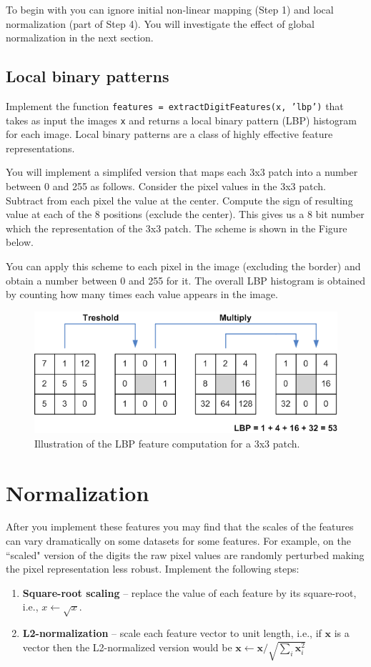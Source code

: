\documentclass[10pt,letterpaper]{article}
\newcommand{\cmd}[1] {{\color{blue}\texttt{#1}}}
\begin{document}
To begin with you can ignore initial non-linear mapping (Step 1) and local normalization (part of Step 4). You will investigate the effect of global normalization in the next section.

\subsection{Local binary patterns}
Implement the function \cmd{features = extractDigitFeatures(x, 'lbp')} that takes as input the images \cmd{x} and returns a local binary pattern (LBP) histogram for each image. Local binary patterns are a class of highly effective feature representations.


You will implement a simplifed version that maps each 3x3 patch into a number between 0 and 255 as follows. Consider the pixel values in the 3x3 patch. Subtract from each pixel the value at the center. Compute the sign of resulting value at each of the 8 positions (exclude the center). This gives us a 8 bit number which the representation of the 3x3 patch. The scheme is shown in the Figure below.

You can apply this scheme to each pixel in the image (excluding the border) and obtain a number between 0 and 255 for it. The overall LBP histogram is obtained by counting how many times each value appears in the image.  

\begin{figure}[h]
\centering
\includegraphics[width=0.5\linewidth]{lbp.png}
\caption{Illustration of the LBP feature computation for a 3x3 patch.} 
\end{figure}

\section{Normalization}
After you implement these features you may find that the scales of the features can vary  dramatically on some datasets for some features. For example, on the ``scaled" version of the digits the raw pixel values are randomly perturbed making the pixel representation less robust. Implement the following steps:
\begin{enumerate}
\item \textbf{Square-root scaling} -- replace the value of each feature by its square-root, i.e., $x \leftarrow \sqrt{x}$.

\item \textbf{L2-normalization} -- scale each feature vector to unit length, i.e., if $\mathbf{x}$ is a vector then the L2-normalized version would be $\mathbf{x} \leftarrow \mathbf{x}/\sqrt{\sum_i \mathbf{x}_i^2}$
\end{enumerate}
\end{document}
